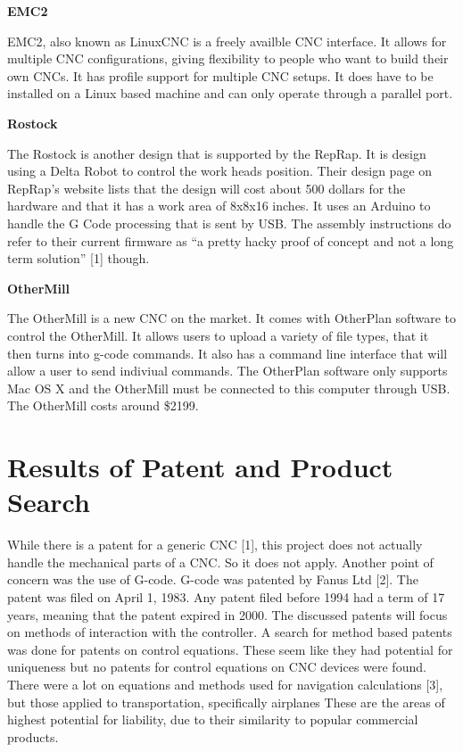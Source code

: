 \textbf{EMC2}

EMC2, also known as LinuxCNC is a freely availble CNC interface.
It allows for multiple CNC configurations, giving flexibility to people who want to build their own CNCs.
It has profile support for multiple CNC setups.
It does have to be installed on a Linux based machine and can only operate through a parallel port.

\textbf{Rostock}

The Rostock is another design that is supported by the RepRap. 
It is design using a Delta Robot to control the work heads position. 
Their design page on RepRap’s website lists that the design will cost about 500 dollars for the hardware and that it has a work area of 8x8x16 inches. 
It uses an Arduino to handle the G Code processing that is sent by USB. 
The assembly instructions do refer to their current firmware as “a pretty hacky proof of concept and not a long term solution” [1] though.

\textbf{OtherMill}

The OtherMill is a new CNC on the market.
It comes with OtherPlan software to control the OtherMill.
It allows users to upload a variety of file types, that it then turns into g-code commands.
It also has a command line interface that will allow a user to send indiviual commands.
The OtherPlan software only supports Mac OS X and the OtherMill must be connected to this computer through USB.
The OtherMill costs around \$2199.

\section{Results of Patent and Product Search}


While there is a patent for a generic CNC [1], this project does not actually handle the mechanical parts of a CNC.
So it does not apply. 
Another point of concern was the use of G-code. G-code was patented by Fanus Ltd [2]. 
The patent was filed on April 1, 1983. 
Any patent filed before 1994 had a term of 17 years, meaning that the patent expired in 2000. 
The discussed patents will focus on methods of interaction with the controller. 
A search for method based patents was done for patents on control equations. 
These seem like they had potential for uniqueness but no patents for control equations on CNC devices were found. 
There were a lot on equations and methods used for navigation calculations [3], but those applied to transportation, specifically airplanes These are the areas of highest potential for liability, due to their similarity to popular commercial products.


